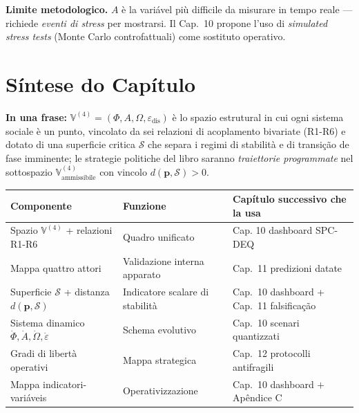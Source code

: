 \Conj{} \textbf{Limite metodologico.} \(A\) è la variável più difficile
da misurare in tempo reale --- richiede \emph{eventi di stress} per
mostrarsi. Il Cap.~10 propone l'uso di \emph{simulated stress tests}
(Monte Carlo controfattuali) come sostituto operativo.



\section{Síntese do Capítulo}\label{sintesi-del-capítulo}

\Proved{} \textbf{In una frase:}
\(\mathbb{V}^{(4)} = (\Phi, A, \Omega, \varepsilon_{\text{dis}})\) è lo
spazio estrutural in cui ogni sistema sociale è un punto, vincolato da
sei relazioni di acoplamento bivariate (R1-R6) e dotato di una
superficie critica \(\mathcal{S}\) che separa i regimi di stabilità e di
transição de fase imminente; le strategie politiche del libro saranno
\emph{traiettorie programmate} nel sottospazio
\(\mathbb{V}^{(4)}_{\text{ammissibile}}\) con vincolo
\(d(\boldsymbol{p}, \mathcal{S}) > 0\).

{\def\LTcaptype{none} %
{\small\begin{longtable}[]{@{}
  >{\raggedright\arraybackslash}p{}
  >{\raggedright\arraybackslash}p{}
  >{\raggedright\arraybackslash}p{}@{}}
\toprule\noalign{}
\begin{minipage}[b]{\linewidth}\raggedright
Componente
\end{minipage} & \begin{minipage}[b]{\linewidth}\raggedright
Funzione
\end{minipage} & \begin{minipage}[b]{\linewidth}\raggedright
Capítulo successivo che la usa
\end{minipage} \\
\midrule\noalign{}
\endhead
\bottomrule\noalign{}
\endlastfoot
Spazio \(\mathbb{V}^{(4)}\) + relazioni R1-R6 & Quadro unificato & Cap.
10 dashboard SPC-DEQ \\
Mappa quattro attori & Validazione interna apparato & Cap.~11 predizioni
datate \\
Superficie \(\mathcal{S}\) + distanza \(d(\boldsymbol{p}, \mathcal{S})\)
& Indicatore scalare di stabilità & Cap.~10 dashboard + Cap.~11
falsificação \\
Sistema dinamico \(\dot\Phi, \dot A, \dot\Omega, \dot\varepsilon\) &
Schema evolutivo & Cap.~10 scenari quantizzati \\
Gradi di libertà operativi & Mappa strategica & Cap.~12 protocolli
antifragili \\
Mappa indicatori-variáveis & Operativizzazione & Cap.~10 dashboard \(+\)
Apêndice C \\
\end{longtable}}
}

